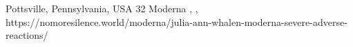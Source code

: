           {Pottsville, Pennsylvania, USA}
          {32}
          {Moderna}
          {}
          {
            ,
            ,
          }
          {https://nomoresilence.world/moderna/julia-ann-whalen-moderna-severe-adverse-reactions/}


